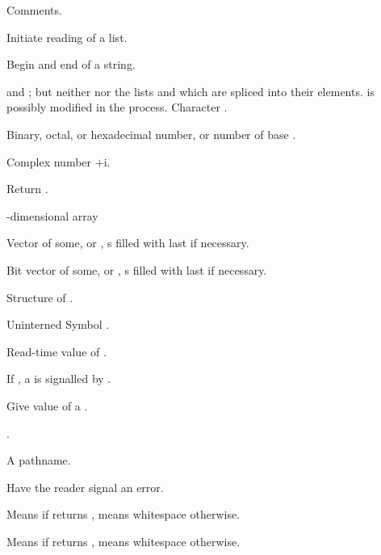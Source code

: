 \begin{LIST}{1cm}

  {
  Comments.
  }

  \IT{\KWD*{(}}
  {
  Initiate reading of a list.
  }

  {
  Begin and end of a string.
  }

  {
    and ; but neither  nor the lists
   and  which are spliced into their
  elements.  is possibly modified in the process.
  }
  {
  Character .
  }

  {
  Binary, octal, or hexadecimal number, or number of base . 
  }

  {Complex number $+$i.
  }

  {
  Return .
  }

  {
  -dimensional array
  }

  {
  \index{\#(}%
  Vector of some, or ,
  s filled with last  if necessary.
  }

  {
  \index{\#*}%
  Bit vector of some, or ,
  s filled with last  if necessary.
  }

  {
  Structure of .
  }

  {
  Uninterned Symbol .
  }

  {
  Read-time value of .
  }

  {
  If \NIL, a  is signalled by .
  }

  {
  \index{\#=}%
  Give value of  a .
  }

  {
  \index{\#\#}%
  .
  }

  {
  A pathname.
  }

  \IT{\KWD{\#\boldmath$<$}}
  {
  Have the reader signal an error.
  }

  {
  Means  if  returns \T, means whitespace
  otherwise. 
  }

  {
  Means  if  returns \NIL, means whitespace
  otherwise. 
  }

\end{LIST}


